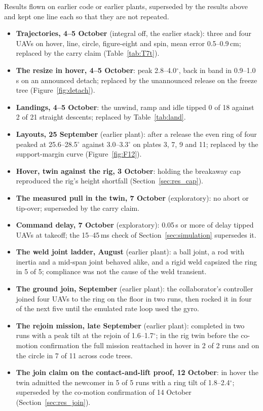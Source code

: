 Results flown on earlier code or earlier plants, superseded by the results above and kept one line each so that they
are not repeated.
\begin{itemize}
    \item \textbf{Trajectories, 4--5 October} (integral off, the earlier stack): three and four UAVs on hover, line,
    circle, figure-eight and spin, mean error 0.5--0.9\,cm; replaced by the carry claim (Table~\ref{tab:T7t}).
    \item \textbf{The resize in hover, 4--5 October}: peak 2.8--4.0$^\circ$, back in band in 0.9--1.0\,s on an
    announced detach; replaced by the unannounced release on the freeze tree (Figure~\ref{fig:detach}).
    \item \textbf{Landings, 4--5 October}: the unwind, ramp and idle tipped 0 of 18 against 2 of 21 straight descents;
    replaced by Table~\ref{tab:land}.
    \item \textbf{Layouts, 25 September} (earlier plant): after a release the even ring of four peaked at
    25.6--28.5$^\circ$ against 3.0--3.3$^\circ$ on plates 3, 7, 9 and 11; replaced by the support-margin curve
    (Figure~\ref{fig:F12}).
    \item \textbf{Hover, twin against the rig, 3 October}: holding the breakaway cap reproduced the rig's height
    shortfall (Section~\ref{sec:res_cap}).
    \item \textbf{The measured pull in the twin, 7 October} (exploratory): no abort or tip-over; superseded by the
    carry claim.
    \item \textbf{Command delay, 7 October} (exploratory): 0.05\,s or more of delay tipped UAVs at takeoff; the 15--45\,ms
    check of Section~\ref{sec:simulation} supersedes it.
    \item \textbf{The weld joint ladder, August} (earlier plant): a ball joint, a rod with inertia and a mid-span joint
    behaved alike, and a rigid weld capsized the ring in 5 of 5; compliance was not the cause of the weld transient.
    \item \textbf{The ground join, September} (earlier plant): the collaborator's controller joined four UAVs to the ring
    on the floor in two runs, then rocked it in four of the next five until the emulated rate loop used the gyro.
    \item \textbf{The rejoin mission, late September} (earlier plant): completed in two runs with a peak tilt at the
    rejoin of 1.6--1.7$^\circ$; in the rig twin before the co-motion confirmation the full mission reattached in hover
    in 2 of 2 runs and on the circle in 7 of 11 across code trees.
    \item \textbf{The join claim on the contact-and-lift proof, 12 October}: in hover the twin admitted the newcomer in
    5 of 5 runs with a ring tilt of 1.8--2.4$^\circ$; superseded by the co-motion confirmation of 14 October
    (Section~\ref{sec:res_join}).
\end{itemize}

